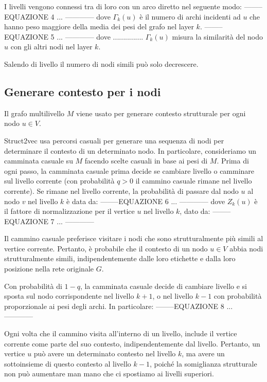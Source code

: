 \documentclass[11pt]{article}
\begin{document}
I livelli vengono connessi tra di loro con un arco diretto nel seguente modo: 
--------EQUAZIONE 4 $...$ ------------
dove $\Gamma_k(u)$ è il numero di archi incidenti ad $u$ che hanno peso maggiore della media dei pesi del grafo nel layer $k$.
--------EQUAZIONE 5 $...$ ------------
dove $..............$.
$\Gamma_k(u)$ misura la similarità del nodo $u$ con gli altri nodi nel layer $k$.

Salendo di livello il numero di nodi simili può solo decrescere.

\subsection{Generare contesto per i nodi}
Il grafo multilivello $M$ viene usato per generare contesto strutturale per ogni nodo $u\in V$.

Struct2vec usa percorsi casuali per generare una sequenza di nodi per determinare il contesto di un determinato nodo. In particolare, consideriamo un camminata casuale su $M$ facendo scelte casuali in base ai pesi di $M$.
Prima di ogni passo, la camminata casuale prima decide se cambiare livello o camminare sul livello corrente (con probabilità $q>0$ il cammino casuale rimane nel livello corrente).
Se rimane nel livello corrente, la probabilità di passare dal nodo $u$ al nodo $v$ nel livello $k$ è data da: 
--------EQUAZIONE 6 $...$ ------------
dove $Z_k(u)$ è il fattore di normalizzazione per il vertice $u$ nel livello $k$, dato da: 
--------EQUAZIONE 7 $...$ ------------

Il cammino casuale preferisce visitare i nodi che sono strutturalmente più simili al vertice corrente.
Pertanto, è probabile che il contesto di un nodo $u\in V$ abbia nodi strutturalmente simili, indipendentemente dalle loro etichette e dalla loro posizione nella rete originale $G$.

Con probabilità di $1-q$, la camminata casuale decide di cambiare livello e si sposta sul nodo corrispondente nel livello $k+1$, o nel livello $k-1$  con probabilità proporzionale ai pesi degli archi. In particolare:
--------EQUAZIONE 8 $...$ ------------

Ogni volta che il cammino visita all'interno di un livello, include il vertice corrente come parte del suo contesto, indipendentemente dal livello. Pertanto, un vertice $u$ può avere un determinato contesto nel livello $k$, ma avere un sottoinsieme di questo contesto al livello $k-1$, poiché la somiglianza strutturale non può aumentare man mano che ci spostiamo ai livelli superiori.
\end{document}
